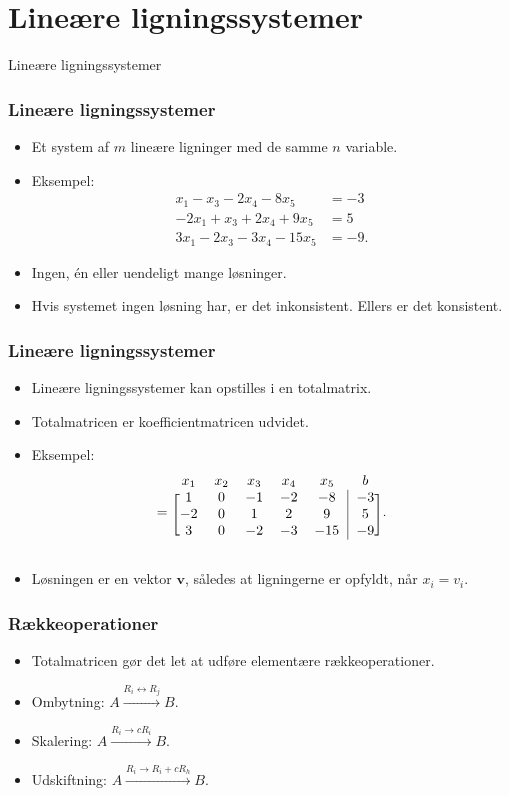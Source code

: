 \section{Lineære ligningssystemer}
\begin{frame}
\centering
\Huge
Lineære ligningssystemer
\end{frame}
%
\begin{frame}
\frametitle{Lineære ligningssystemer}
\begin{itemize}
\item Et system af $m$ lineære ligninger med de samme $n$ variable. 
\item Eksempel:
\begin{align*}
x_1-x_3-2x_4-8x_5&=-3 \\
-2x_1+x_3+2x_4+9x_5&=5 \\
3x_1-2x_3-3x_4-15x_5&=-9.
\end{align*}
\item Ingen, én eller uendeligt mange løsninger. 
\item Hvis systemet ingen løsning har, er det inkonsistent. Ellers er det konsistent. 
\end{itemize}
\end{frame}
\begin{frame}
\frametitle{Lineære ligningssystemer}
\begin{itemize}
\item Lineære ligningssystemer kan opstilles i en totalmatrix. 
\item Totalmatricen er koefficientmatricen udvidet. 
\item Eksempel:
\begin{equation*}
  [A \mid \mathbf{b}] =
\begin{blockarray}{ccccccc}
x_1 & x_2 & x_3 & x_4 & x_5 & b \\
\begin{block}{[ccccc|c]c}
  1 & 0 & -1 & -2 & -8 & -3 \\
  -2 & 0 & 1 & 2 & 9 & 5 \\
  3 & 0 & -2 & -3 & -15 & -9 \\
\end{block}
\end{blockarray}.
\end{equation*}
\item Løsningen er en vektor $\mathbf{v}$, således at ligningerne er opfyldt, når $x_i = v_i$.
\end{itemize}
\end{frame}
\begin{frame}
\frametitle{Rækkeoperationer}
\begin{itemize}
\item Totalmatricen gør det let at udføre elementære rækkeoperationer. 
\item Ombytning: $A \xrightarrow{R_i \leftrightarrow R_j} B$. 
\item Skalering: $A \xrightarrow{R_i \rightarrow cR_i} B$.
\item Udskiftning: $A \xrightarrow{R_i \rightarrow R_i + cR_h} B$.
\end{itemize}
\end{frame}
